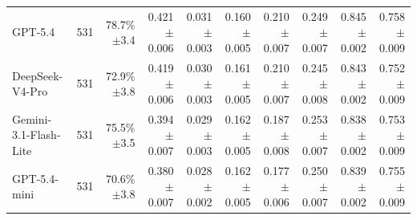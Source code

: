 \begin{table}[t]
\begin{tabular*}{\textwidth}{@{\extracolsep{\fill}}lrrrrrrrrr@{}}
GPT-5.4 & 531 & \shortstack[r]{78.7\%\\{\scriptsize $\pm$3.4}} & \shortstack[r]{0.421\\{\scriptsize $\pm$0.006}} & \shortstack[r]{0.031\\{\scriptsize $\pm$0.003}} & \shortstack[r]{0.160\\{\scriptsize $\pm$0.005}} & \shortstack[r]{0.210\\{\scriptsize $\pm$0.007}} & \shortstack[r]{0.249\\{\scriptsize $\pm$0.007}} & \shortstack[r]{0.845\\{\scriptsize $\pm$0.002}} & \shortstack[r]{0.758\\{\scriptsize $\pm$0.009}} \\
DeepSeek-V4-Pro & 531 & \shortstack[r]{72.9\%\\{\scriptsize $\pm$3.8}} & \shortstack[r]{0.419\\{\scriptsize $\pm$0.006}} & \shortstack[r]{0.030\\{\scriptsize $\pm$0.003}} & \shortstack[r]{0.161\\{\scriptsize $\pm$0.005}} & \shortstack[r]{0.210\\{\scriptsize $\pm$0.007}} & \shortstack[r]{0.245\\{\scriptsize $\pm$0.008}} & \shortstack[r]{0.843\\{\scriptsize $\pm$0.002}} & \shortstack[r]{0.752\\{\scriptsize $\pm$0.009}} \\
Gemini-3.1-Flash-Lite & 531 & \shortstack[r]{75.5\%\\{\scriptsize $\pm$3.5}} & \shortstack[r]{0.394\\{\scriptsize $\pm$0.007}} & \shortstack[r]{0.029\\{\scriptsize $\pm$0.003}} & \shortstack[r]{0.162\\{\scriptsize $\pm$0.005}} & \shortstack[r]{0.187\\{\scriptsize $\pm$0.008}} & \shortstack[r]{0.253\\{\scriptsize $\pm$0.007}} & \shortstack[r]{0.838\\{\scriptsize $\pm$0.002}} & \shortstack[r]{0.753\\{\scriptsize $\pm$0.009}} \\
GPT-5.4-mini & 531 & \shortstack[r]{70.6\%\\{\scriptsize $\pm$3.8}} & \shortstack[r]{0.380\\{\scriptsize $\pm$0.007}} & \shortstack[r]{0.028\\{\scriptsize $\pm$0.002}} & \shortstack[r]{0.162\\{\scriptsize $\pm$0.005}} & \shortstack[r]{0.177\\{\scriptsize $\pm$0.006}} & \shortstack[r]{0.250\\{\scriptsize $\pm$0.007}} & \shortstack[r]{0.839\\{\scriptsize $\pm$0.002}} & \shortstack[r]{0.755\\{\scriptsize $\pm$0.009}} \\

\end{tabular*}
\end{table}
